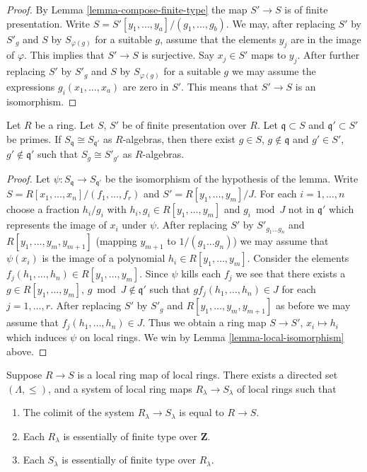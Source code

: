 \begin{proof}
By Lemma \ref{lemma-compose-finite-type}
the map $S' \to S$ is of finite presentation.
Write $S = S'[y_1, \ldots, y_a]/(g_1, \ldots, g_b)$.
We may, after replacing $S'$ by $S'_{g}$ and $S$ by $S_{\varphi(g)}$
for a suitable $g$, assume that the elements $y_j$ are in the
image of $\varphi$. This implies that $S' \to S$ is surjective.
Say $x_j \in S'$ maps to $y_j$. After further replacing
$S'$ by $S'_{g}$ and $S$ by $S_{\varphi(g)}$
for a suitable $g$ we may assume the expressions
$g_i(x_1, \ldots, x_a)$ are zero in $S'$.
This means that $S' \to S$ is an isomorphism.
\end{proof}

\begin{lemma}
\label{lemma-isomorphic-local-rings}
Let $R$ be a ring.
Let $S$, $S'$ be of finite presentation over $R$.
Let $\mathfrak q \subset S$ and $\mathfrak q' \subset S'$
be primes. If $S_{\mathfrak q} \cong S_{\mathfrak q'}$ as
$R$-algebras, then there exist $g \in S$, $g \not \in \mathfrak q$
and $g' \in S'$, $g' \not \in \mathfrak q'$ such that
$S_g \cong S'_{g'}$ as $R$-algebras.
\end{lemma}

\begin{proof}
Let $\psi : S_{\mathfrak q} \to S_{\mathfrak q'}$ be the isomorphism
of the hypothesis of the lemma.
Write $S = R[x_1, \ldots, x_n]/(f_1, \ldots, f_r)$ and
$S' = R[y_1, \ldots, y_m]/J$.
For each $i = 1, \ldots, n$ choose a fraction
$h_i/g_i$ with $h_i, g_i \in R[y_1, \ldots, y_m]$
and $g_i \bmod J$ not in $\mathfrak q'$ which represents
the image of $x_i$ under $\psi$. After replacing
$S'$ by $S'_{g_1 \ldots g_n}$ and
$R[y_1, \ldots, y_m, y_{m + 1}]$ (mapping $y_{m + 1}$ to $1/(g_1\ldots g_n)$)
we may assume that $\psi(x_i)$ is the image of a polynomial
$h_i \in R[y_1, \ldots, y_m]$. Consider the elements
$f_j(h_1, \ldots, h_n) \in R[y_1, \ldots, y_m]$.
Since $\psi$ kills each $f_j$ we see that
there exists a $g \in R[y_1, \ldots, y_m]$, $g \bmod J \not \in \mathfrak q'$
such that $g f_j(h_1, \ldots, h_n) \in J$ for each $j = 1, \ldots, r$.
After replacing $S'$ by $S'_{g}$ and
$R[y_1, \ldots, y_m, y_{m + 1}]$ as before we may assume that
$f_j(h_1, \ldots, h_n) \in J$. Thus we obtain a ring map
$S \to S'$, $x_i \mapsto h_i$ which induces $\psi$ on local rings.
We win by Lemma \ref{lemma-local-isomorphism} above.
\end{proof}

\begin{lemma}
\label{lemma-limit-no-condition-local}
Suppose $R \to S$ is a local ring map of local rings.
There exists a directed set $(\Lambda, \leq)$, and
a system of local ring maps $R_\lambda \to S_\lambda$
of local rings such that
\begin{enumerate}
\item The colimit of the system $R_\lambda \to S_\lambda$
is equal to $R \to S$.
\item Each $R_\lambda$ is essentially of finite type
over $\mathbf{Z}$.
\item Each $S_\lambda$ is essentially of finite type
over $R_\lambda$.
\end{enumerate}
\end{lemma}

